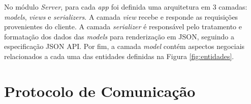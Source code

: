No módulo \textit{Server}, para cada \textit{app} foi definida uma arquitetura
em 3 camadas: \textit{models}, \textit{views} e \textit{serializers}.
A camada \textit{view} recebe e responde as requisições provenientes do cliente.
A camada \textit{serializer} é responsável pelo tratamento e formatação dos dados das \textit{models}
para renderização em JSON, seguindo a especificação JSON API.
Por fim, a camada \textit{model} contém aspectos negociais relacionados a cada uma das entidades definidas na 
Figura \ref{fig:entidades}. 

\section{Protocolo de Comunicação}

% 
% 


% 
% 
